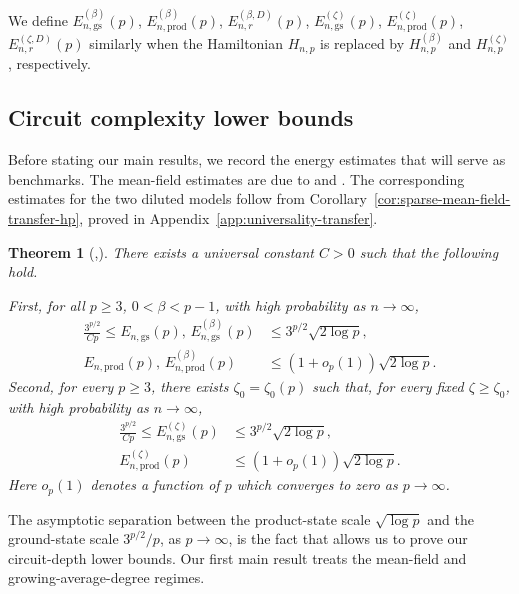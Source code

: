 \documentclass[12pt]{article}
\newtheorem{theorem}{Theorem}
\begin{document}
We define $E_{n,\mathrm{gs}}^{(\beta)}(p)$, $E_{n,\mathrm{prod}}^{(\beta)}(p)$, 
$E_{n,r}^{(\beta,D)}(p)$, 
$E_{n,\mathrm{gs}}^{(\zeta)}(p)$, $E_{n,\mathrm{prod}}^{(\zeta)}(p)$, 
$E_{n,r}^{(\zeta,D)}(p)$ similarly when the Hamiltonian $H_{n,p}$
is replaced by $H_{n,p}^{(\beta)}$ and $H_{n,p}^{(\zeta)}$, respectively.

\subsection{Circuit complexity lower bounds}


Before stating our main results, we record the energy estimates that will
serve as benchmarks. The mean-field estimates are due to
\cite[Theorems~2 and 6]{anschuetz2025bounds} and
\cite[Corollary~D.2]{anschuetz2025strongly}. The corresponding estimates
for the two diluted models follow from
Corollary~\ref{cor:sparse-mean-field-transfer-hp}, proved in
Appendix~\ref{app:universality-transfer}.


\begin{theorem}
[\cite{anschuetz2025bounds},\cite{anschuetz2025strongly}]
\label{thm:benchmarks}
There exists a universal constant \(C>0\) such that the following hold.

First, for all  $p \ge 3$, \(0<\beta<p-1\), with high
probability as \(n\to\infty\),
\begin{align*}
\frac{3^{p/2}}{Cp}
\le
E_{n,\mathrm{gs}}(p),\,
E_{n,\mathrm{gs}}^{(\beta)}(p)
&\le
3^{p/2}\sqrt{2\log p}, \\
E_{n,\mathrm{prod}}(p),\,
E_{n,\mathrm{prod}}^{(\beta)}(p)
&\le
(1+o_p(1))\sqrt{2\log p}.
\end{align*}
Second, for every \(p\ge3\), there exists
\(\zeta_0=\zeta_0(p)\) such that, for every fixed
\(\zeta\ge\zeta_0\), with high probability as \(n\to\infty\),
\begin{align*}
\frac{3^{p/2}}{Cp}
\le
E_{n,\mathrm{gs}}^{(\zeta)}(p)
&\le
3^{p/2}\sqrt{2\log p}, \\
E_{n,\mathrm{prod}}^{(\zeta)}(p)
&\le
(1+o_p(1))\sqrt{2\log p}.
\end{align*}
Here  \(o_p(1)\) denotes a function of $p$ which converges to zero as $p\to\infty$.
\end{theorem}


The asymptotic separation between the product-state scale \(\sqrt{\log p}\) and the ground-state scale \(3^{p/2}/p\), as \(p\to\infty\), is the fact that allows us to prove our circuit-depth lower bounds. Our first main result treats the mean-field and growing-average-degree regimes.
\end{document}
